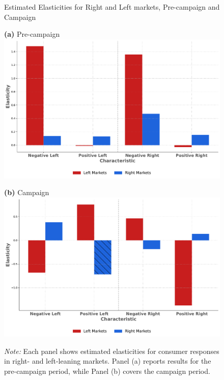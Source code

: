 \documentclass[12pt]{article}
\begin{document}
\begin{figure}[ht]
	\centering
	\caption{Estimated Elasticities for Right and Left markets, Pre-campaign and Campaign}
	
	\vspace{0.5em} %
	
	\begin{minipage}{0.45\textwidth}
		\centering
		\textbf{(a)} Pre-campaign\\
		\includegraphics[width=\linewidth]{figures/elasticities_pre_campaign}
		\label{fig:2figsA}
	\end{minipage}
	\hfill
	\begin{minipage}{0.45\textwidth}
		\centering
		\textbf{(b)} Campaign\\
		\includegraphics[width=\linewidth]{figures/elasticities_campaign}
		\label{fig:2figsB}
	\end{minipage}
	
	\vspace{0.5em} %
	
	\captionsetup{justification=justified}
	\caption*{\textit{Note:} \small Each panel shows estimated elasticities for consumer responses in right- and left-leaning markets. Panel (a) reports results for the pre-campaign period, while Panel (b) covers the campaign period.}
\end{figure}
\end{document}
